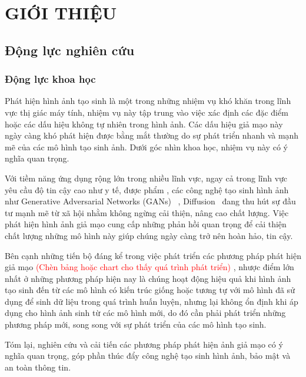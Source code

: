 \chapter{GIỚI THIỆU}
\label{Chapter1}
\section{Động lực nghiên cứu}
\subsection{Động lực khoa học}
Phát hiện hình ảnh tạo sinh là một trong những nhiệm vụ khó khăn trong lĩnh vực thị giác máy tính, nhiệm vụ này tập trung vào việc xác định các đặc điểm hoặc các dấu hiệu không tự nhiên trong hình ảnh. Các dấu hiệu giả mạo này ngày càng khó phát hiện được bằng mắt thường do sự phát triển nhanh và mạnh mẽ của các mô hình tạo sinh ảnh. Dưới góc nhìn khoa học, nhiệm vụ này có ý nghĩa quan trọng.

Với tiềm năng ứng dụng rộng lớn trong nhiều lĩnh vực, ngay cả trong lĩnh vực yêu cầu độ tin cậy cao như y tế, được phẩm \cite{wolleb2022diffusionmodelsmedicalanomaly,kazerouni2023diffusionmodelsmedicalimage}, các công nghệ tạo sinh hình ảnh như Generative Adversarial Networks (GANs)~\cite{Goodfellow2014GenerativeAN} , Diffusion~\cite{Ho2020DenoisingDP} đang thu hút sự đầu tư mạnh mẽ từ xã hội nhằm không ngừng cải thiện, nâng cao chất lượng. Việc phát hiện hình ảnh giả mạo cung cấp những phản hồi quan trọng để cải thiện chất lượng những mô hình này \cite{Ho2020DenoisingDP, Goodfellow2014GenerativeAN} giúp chúng ngày càng trở nên hoàn hảo, tin cậy.

Bên cạnh những tiến bộ đáng kể trong việc phát triển các phương pháp phát hiện giả mạo \textcolor{red}{(Chèn bảng hoặc chart cho thấy quá trình phát triển) }, nhược điểm lớn nhất ở những phương pháp hiện nay là chúng hoạt động hiệu quả khi hình ảnh tạo sinh đến từ các mô hình có kiến trúc giống hoặc tương tự với mô hình đã sử dụng để sinh dữ liệu trong quá trình huấn luyện, nhưng lại không ổn định khi áp dụng cho hình ảnh sinh từ các mô hình mới, do đó cần phải phát triển những phương pháp mới, song song với sự phát triển của các mô hình tạo sinh.

Tóm lại, nghiên cứu và cải tiến các phương pháp phát hiện ảnh giả mạo có ý nghĩa quan trọng, góp phần thúc đẩy công nghệ tạo sinh hình ảnh, bảo mật và an toàn thông tin.

